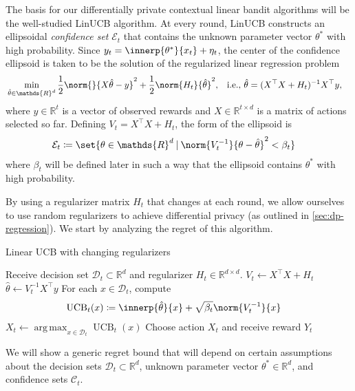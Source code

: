 \documentclass{article}
\newcommand{\defeq}{\coloneq}
\newcommand{\inv}[1]{#1^{-1}}
\newcommand{\Real}{\mathds{R}}
\newcommand{\UCB}{\operatorname{UCB}}
\DeclareMathOperator*{\argmax}{arg\,max}
\newcommand\given[1][\delimsize]{%
  \providecommand{\delimsize}{}
  \nonscript\:#1\vert\allowbreak\nonscript\:\mathopen{}
}
\newcommand{\E}{\mathcal{E}}
\providecommand\transp{\top}
\let\transpsymbol\transp
\renewcommand{\transp}[1]{#1^\transpsymbol}
\newcommand{\Dset}[1]{\mathcal{D}_{#1}}
\newcommand{\Cset}[1]{\mathcal{C}_{#1}}
\begin{document}
The basis for our differentially private contextual linear bandit
algorithms will be the well-studied LinUCB  algorithm.
At every round, LinUCB constructs an ellipsoidal \emph{confidence set}
$\E_t$ that contains the unknown parameter vector $\theta^*$ with high
probability.  Since $y_t = \innerp{\theta^*}{x_t} + \eta_t$, the center of
the confidence ellipsoid is taken to be the solution of the
regularized linear regression problem
\begin{align*}
  &\min_{\hat\theta \in \Real^d} \frac{1}{2}\norm{}{X\hat\theta - y}^2 + \frac{1}{2}\norm{H_t}{\hat\theta}^2,
  && \text{i.e., } \hat\theta = \inv{(\transp{X}X + H_t)}\transp{X}y,
\end{align*}
where $y\in\Real^t$ is a vector of observed rewards and
$X\in\Real^{t\times d}$ is a matrix of actions selected so far.
Defining $V_t = \transp{X}X + H_t$, the form of the ellipsoid is
\begin{align*}
  \E_t &\defeq \set{\theta\in\Real^d \given \norm{\inv{V_t}}{\theta-\hat\theta}^2 < \beta_t}
\end{align*}
where $\beta_t$ will be defined later in such a way that the ellipsoid
contains $\theta^*$ with high probability.

By using a regularizer matrix $H_t$ that changes at each round, we
allow ourselves to use random regularizers to achieve differential
privacy (as outlined in \cref{sec:dp-regression}).  We start by
analyzing the regret of this algorithm.

\begin{algorithm}
  \caption{Linear UCB with changing regularizers}\label{alg:linucb}
  \begin{algorithmic}
    \State Receive decision set $\Dset{t} \subset \Real^d$ and
    regularizer $H_t \in \Real^{d\times d}$.
    \State $V_t \gets \transp{X}X + H_t$
    \State $\hat\theta \gets \inv{V_t}\transp{X}y$
    \State For each $x\in\Dset{t}$, compute
    \begin{align*}
      \UCB_t(x) &\defeq \innerp{\hat\theta}{x} + \sqrt{\beta_t}\norm{\inv{V_t}}{x}
    \end{align*}
    \State $X_t \gets \argmax_{x\in\Dset{t}} \UCB_t(x)$
    \State Choose action $X_t$ and receive reward $Y_t$
    \EndFor
  \end{algorithmic}
\end{algorithm}

We will show a generic regret bound that will depend on certain
assumptions about the decision sets $\Dset{t} \subset \Real^d$,
unknown parameter vector $\theta^*\in\Real^d$, and confidence sets
$\Cset{t}$.
\end{document}
